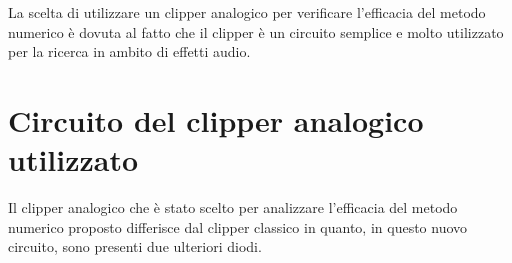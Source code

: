 		La scelta di utilizzare un clipper analogico per verificare l'efficacia del metodo numerico è dovuta al fatto che il clipper è un circuito semplice e molto utilizzato per la ricerca in ambito di effetti audio.
	\pagebreak
	
	\section{Circuito del clipper analogico utilizzato}
		Il clipper analogico che è stato scelto per analizzare l'efficacia del metodo numerico proposto differisce dal clipper classico in quanto, in questo nuovo circuito, sono presenti due ulteriori diodi.
		
		\vspace{15px}
		\begin{comment}
		\begin{figure}[H]
			\centering
			\begin{circuitikz}[american voltages]
				\draw
				(-1,7) to[sinusoidal voltage source,l_=$V_{in}$] (-1,0)		%
				(-1,7) to[resistor=$R_{in}$] (3,7)							%
				to[short, i^=$i_{in}$] (4,7)									%
				to[short, i^=$i_{out}$] (5,7)								%
				-- (8,7)														%
				to[C, l_=$C$] (8,0)											%
				-- (-1,0)													%
				(4,0) node[ground]{}											%
				
				(4,7) to[short, *-*] (4,6)			%
				(4,7) to[short, i^=$i_{D}$] (4,6)	%
				(5,6) -- (3,6)						%
				to[empty diode, l=$D_{A}$] (3,4)		%
				-- (5,4)								%
				to[empty diode, l_=$D_{A}$] (5,6)	%
				(4,4) to[short, *-*] (4,3)			%
				(5,3) -- (3,3)						%
				to[full diode, l=$D_{B}$] (3,1)		%
				-- (5,1)								%
				to[full diode, l_=$D_{B}$] (5,3)		%
				(4,1) to[short, *-*] (4,0)			%
				
				(-1,2.5) to[open, v_<=$$, outer sep = 2mm] (-1,4.5)			%
				(3,6) to[open, v_=$V_{A}$, outer sep = 5mm] (3,4)			%
				(3,3) to[open, v_=$V_{B}$, outer sep = 5mm] (3,1)			%
				(8,7) to[open, v^=$V_{out}$, outer sep = 6mm] (8,0)			%
				;
			\end{circuitikz}
			\caption{Circuito elettronico del clipper audio utilizzato}
			\label{fig:clipper}
		\end{figure}
		\end{comment}
